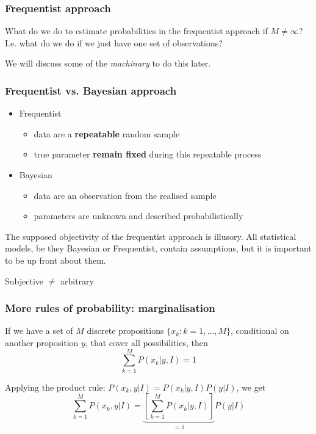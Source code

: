 \begin{frame}

\frametitle{Frequentist approach}
\label{frequentistapproach}

What do we do to estimate probabilities in the frequentist approach if $M \ne \infty$? I.e. what do
we do if we just have one set of observations?

We will discuss some of the \emph{machinary} to do this later.

\end{frame}

\begin{frame}

\frametitle{Frequentist vs. Bayesian approach}
\label{frequentistvs.bayesianapproach}

\begin{itemize}
\item Frequentist

\begin{itemize}
\item data are a \textbf{repeatable} random sample

\item true parameter \textbf{remain fixed} during this repeatable process

\end{itemize}

\item Bayesian

\begin{itemize}
\item data are an observation from the realised sample

\item parameters are unknown and described probabilistically

\end{itemize}

\end{itemize}

The supposed objectivity of the frequentist approach is illusory. All statistical models, be they
Bayesian or Frequentist, contain assumptions, but it is important to be up front about them.

\begin{center}Subjective $\ne$ arbitrary\end{center}

\end{frame}

\begin{frame}

\frametitle{More rules of probability: marginalisation}
\label{morerulesofprobability:marginalisation}

If we have a set of $M$ discrete propositions $\{x_k:k=1,\ldots,M\}$, conditional on another
proposition $y$, that cover all possibilities, then
\[
\sum_{k=1}^M P(x_k|y,I) = 1
\]

Applying the product rule: $P(x_k,y|I) = P(x_k|y,I)P(y|I)$, we get
\[
\sum_{k=1}^M  P(x_k,y|I) = \underbrace{\left[ \sum_{k=1}^M P(x_k|y,I) \right]}_{=1} P(y|I)
\]

\end{frame}

